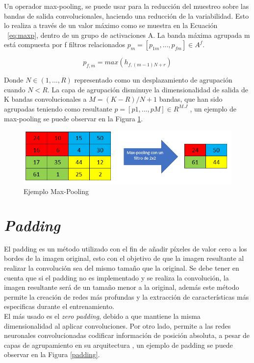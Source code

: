 Un operador max-pooling, se puede usar para la reducción del muestreo sobre las bandas de salida convolucionales, haciendo una reducción de la variabilidad. Esto lo realiza a través de un valor máximo como se muestra en la Ecuación ~\ref{eq:maxp}, dentro de un grupo de activaciones A. La banda máxima agrupada m está compuesta por f filtros relacionados $p_{m}=[p_{1m},...,p_{fm}] \in A^f$.

\begin{equation}
	\label{eq:maxp}
	p_{f,m}=max(h_{f,(m-1)N+r})
\end{equation}

Donde $N \in (1,...,R) $ representado como un desplazamiento de agrupación cuando $N < R$. La capa de agrupación disminuye la dimensionalidad de salida de K bandas convolucionales a $M=(K-R)/N+1$ bandas, que han sido agrupadas teniendo como resultante $p=[p1,...,pM] \in R^{M.J}$ \cite{gholamalinezhad2020pooling}, un ejemplo de max-pooling se puede observar en la Figura \ref{mp}.

\begin{figure}[ht]
	\centering
	\includegraphics[scale=0.6]{Figs/mp.png}
	\caption{Ejemplo Max-Pooling}
	\label{mp}
\end{figure}



\section{\textit{Padding}}

El padding es un método utilizado con el fin de añadir píxeles de valor cero a los bordes de la imagen original, esto con el objetivo de que la imagen resultante al realizar la convolución sea del mismo tamaño que la original. Se debe tener en cuenta que si el padding no es implementado y se realiza la convolución, la imagen resultante será de un tamaño menor a la original, además este método permite la creación de redes más profundas y la extracción de características más especificas durante el entrenamiento.\\

El más usado es el \textit{zero padding}, debido a que mantiene la misma dimensionalidad al aplicar convoluciones. Por otro lado, permite a las redes neuronales convolucionadas codificar información de posición absoluta, a pesar de capas de agrupamiento en su arquitectura \cite{islam2021position}, un ejemplo de padding se puede observar en la Figura \ref{padding}.

